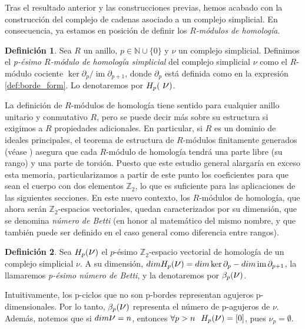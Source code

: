 \documentclass[12pt, a4paper, twoside]{book}
\numberwithin{equation}{section}
\theoremstyle{definition}
\newtheorem{defi}{Definición}[section]
\theoremstyle{remark}
\theoremstyle{plain}
\DeclareMathOperator{\Ima}{im}
\begin{document}
	Tras el resultado anterior y las construcciones previas, hemos acabado
	con la construcción del complejo de cadenas asociado a un complejo 
	simplicial. En consecuencia, ya estamos en posición de definir los
	\emph{$R$-módulos de homología}.

	\begin{defi}
		\label{defi:homology}
		Sea $R$ un anillo, $p \in \mathbb{N}\cup\{0\}$ y 
		{\Large $\nu$} un complejo 
		simplicial. Definimos el \textit{p-ésimo $R$-módulo de 
		homología simplicial} del complejo simplicial {\Large $\nu$} 
		como el $R$-módulo cociente $\ker \partial_{p}/
		\Ima\partial_{p+1}$, donde $\partial_{p}$ está definida como
		en la expresión \ref{def:borde_form}. Lo denotaremos por 
		$H_{p}(\text{
		{\Large $\nu$}})$.
	\end{defi}

	La definición de $R$-módulos de homología tiene sentido para cualquier 
	anillo unitario y conmutativo $R$, pero se puede decir más sobre su 
	estructura si exigimos a $R$ propiedades adicionales. En particular, 
	si $R$ es un dominio de ideales principales, el teorema de estructura 
	de $R$-módulos finitamente generados (véase \cite{Algebra-Elduque}) 
	asegura que cada $R$-módulo de homología tendrá una parte libre 
	(su rango) y 
	una parte de torsión. Puesto que este estudio general alargaría en 
	exceso esta memoria, particularizamos a partir de este punto los 
	coeficientes para que sean el cuerpo con dos elementos 
	$\mathbb{Z}_{2}$, 
	lo que es suficiente para las aplicaciones de las siguientes 
	secciones. En este nuevo contexto, los $R$-módulos de homología, que 
	ahora serán $\mathbb{Z}_{2}$-espacios vectoriales, quedan 
	caracterizados por su dimensión, que se denomina \emph{número de 
	Betti} (en honor al matemático del mismo nombre, y que también puede 
	ser definido en el caso general como diferencia entre rangos).

	\begin{defi}
		Sea $H_{p}(\text{{\Large $\nu$}})$ el $p$-ésimo 
		$\mathbb{Z}_{2}$-espacio vectorial de homología de un complejo
		simplicial {\Large $\nu$}.
		A su dimensión, $dimH_{p}(\text{{\Large $\nu$}})=
		dim \ker\partial_{p}-dim\Ima\partial_{p+1}$, la 
		llamaremos \textit{p-ésimo número de Betti}, y la denotaremos
		por $\beta_{p}(\text{{\Large $\nu$}})$.
	\end{defi}

	Intuitivamente, los p-ciclos que no son p-bordes representan agujeros
	p-dimensionales. Por lo tanto, $\beta_{p}(\text{{\Large $\nu$}})$ 
	representa el número de p-agujeros de {\Large $\nu$}. Además, notemos 
	que si $dim\text{{\Large $\nu$}}=n$, entonces $\forall p >n 
	\hspace{0.25cm} H_{p}(\text{{\Large $\nu$}})=[0]$, pues 
	{\Large $\nu$}$_{p}=\emptyset$.
\end{document}
